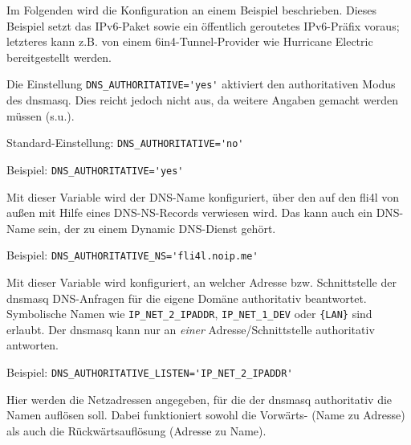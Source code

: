 Im Folgenden wird die Konfiguration an einem Beispiel beschrieben. Dieses
Beispiel setzt das IPv6-Paket sowie ein öffentlich geroutetes IPv6-Präfix
voraus; letzteres kann z.B. von einem 6in4-Tunnel-Provider wie Hurricane
Electric bereitgestellt werden.

\begin{description}


Die Einstellung \verb+DNS_AUTHORITATIVE='yes'+ aktiviert den authoritativen
Modus des dnsmasq. Dies reicht jedoch nicht aus, da weitere Angaben gemacht
werden müssen (s.u.).

Standard-Einstellung: \verb+DNS_AUTHORITATIVE='no'+

Beispiel: \verb+DNS_AUTHORITATIVE='yes'+


Mit dieser Variable wird der DNS-Name konfiguriert, über den auf den fli4l von
außen mit Hilfe eines DNS-NS-Records verwiesen wird. Das kann auch ein DNS-Name
sein, der zu einem Dynamic DNS-Dienst gehört.

Beispiel: \verb+DNS_AUTHORITATIVE_NS='fli4l.noip.me'+


Mit dieser Variable wird konfiguriert, an welcher Adresse bzw. Schnittstelle
der dnsmasq DNS-Anfragen für die eigene Domäne authoritativ beantwortet.
Symbolische Namen wie \verb+IP_NET_2_IPADDR+, \verb+IP_NET_1_DEV+ oder
\verb+{LAN}+ sind erlaubt. Der dnsmasq kann nur an \emph{einer}
Adresse/Schnittstelle authoritativ antworten.


Beispiel: \verb+DNS_AUTHORITATIVE_LISTEN='IP_NET_2_IPADDR'+


Hier werden die Netzadressen angegeben, für die der dnsmasq authoritativ die
Namen auflösen soll. Dabei funktioniert sowohl die Vorwärts- (Name zu Adresse)
als auch die Rückwärtsauflösung (Adresse zu Name).


\end{description}
